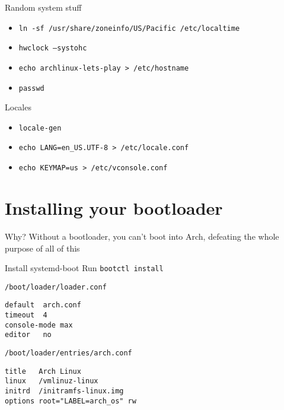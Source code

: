 \documentclass{beamer}
\begin{document}
\begin{frame}{Random system stuff}
    \begin{itemize}
        \item \texttt{ln -sf /usr/share/zoneinfo/US/Pacific /etc/localtime}
        \item \texttt{hwclock --systohc}
        \item \texttt{echo archlinux-lets-play > /etc/hostname}
        \item \texttt{passwd}
    \end{itemize}
\end{frame}

\begin{frame}{Locales}
    \begin{itemize}
        \item \texttt{locale-gen}
        \item \texttt{echo LANG=en\_US.UTF-8 > /etc/locale.conf}
        \item \texttt{echo KEYMAP=us > /etc/vconsole.conf}
    \end{itemize}
\end{frame}

\section{Installing your bootloader}

\begin{frame}{Why?}
    Without a bootloader, you can't boot into Arch, defeating the whole purpose of all of this
\end{frame}

\begin{frame}[fragile]{Install systemd-boot}
    Run \texttt{bootctl install}

    \begin{exampleblock}{\texttt{/boot/loader/loader.conf}}
        \begin{verbatim}
default  arch.conf
timeout  4
console-mode max
editor   no\end{verbatim}
    \end{exampleblock}

    \begin{exampleblock}{\texttt{/boot/loader/entries/arch.conf}}
        \begin{verbatim}
title   Arch Linux
linux   /vmlinuz-linux
initrd  /initramfs-linux.img
options root="LABEL=arch_os" rw\end{verbatim}
    \end{exampleblock}
\end{frame}
\end{document}
